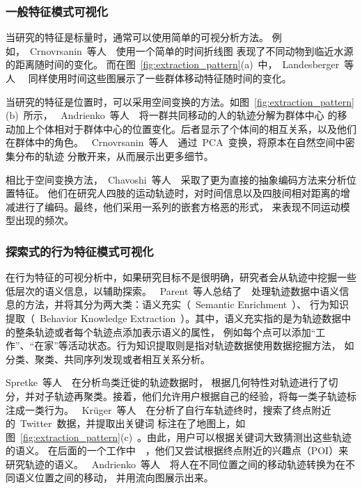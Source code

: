 \documentclass[12pt,twocolumn]{article}
\begin{document}
\subsubsection{一般特征模式可视化}

当研究的特征是标量时，通常可以使用简单的可视分析方法。
例如，~Crnovrsanin~等人~\citep{CrnovrsaninMCM2009}~使用一个简单的时间折线图
表现了不同动物到临近水源的距离随时间的变化。
而在图~\ref{fig:extraction_pattern}(a)~中，~Landesberger~等人~\citep{LandesbergerBSF2012}~
同样使用时间这些图展示了一些群体移动特征随时间的变化。

当研究的特征是位置时，可以采用空间变换的方法。如图~\ref{fig:extraction_pattern}(b)~所示，
~Andrienko~等人~\citep{AndrienkoABDH2013}~将一群共同移动的人的轨迹分解为群体中心
的移动加上个体相对于群体中心的位置变化。后者显示了个体间的相互关系，以及他们在群体中的角色。
~Crnovrsanin~等人~\citep{CrnovrsaninMCM2009}~通过~PCA~变换，将原本在自然空间中密集分布的轨迹
分散开来，从而展示出更多细节。

相比于空间变换方法，~Chavoshi~等人~\citep{ChavoshiBNTW2012}~采取了更为直接的抽象编码方法来分析位置特征。
他们在研究人四肢的运动轨迹时，对时间信息以及四肢间相对距离的增减进行了编码。最终，他们采用一系列的嵌套方格恶的形式，
来表现不同运动模型出现的频次。

\subsubsection{探索式的行为特征模式可视化}

在行为特征的可视分析中，如果研究目标不是很明确，研究者会从轨迹中挖掘一些低层次的语义信息，以辅助探索。
~Parent~等人总结了~\citep{ParentSRAAB2013}~处理轨迹数据中语义信息的方法，并将其分为两大类：语义充实（~Semantic Enrichment~）、
行为知识提取（~Behavior Knowledge Extraction~）。其中，语义充实指的是为轨迹数据中的整条轨迹或者每个轨迹点添加表示语义的属性，
例如每个点可以添加“工作”、“在家”等活动状态。行为知识提取则是指对轨迹数据使用数据挖掘方法，
如分类、聚类、共同序列发现或者相互关系分析。

Spretke~等人~\citep{SpretkeBJKMD2011}~在分析鸟类迁徙的轨迹数据时，
根据几何特性对轨迹进行了切分，并对子轨迹再聚类。接着，他们允许用户根据自己的经验，将每一类子轨迹标注成一类行为。
~Krüger~等人~\citep{KrugerLTBE2012}~在分析了自行车轨迹终时，搜索了终点附近的~Twitter~数据，并提取出关键词
标注在了地图上，如图~\ref{fig:extraction_pattern}(c)~。由此，用户可以根据关键词大致猜测出这些轨迹的语义。
在后面的一个工作中~\citep{KruegerTE2014}~，他们又尝试根据终点附近的兴趣点（POI）来研究轨迹的语义。
~Andrienko~等人~\citep{AndrienkoAF2013}~将人在不同位置之间的移动轨迹转换为在不同语义位置之间的移动，
并用流向图展示出来。
\end{document}

